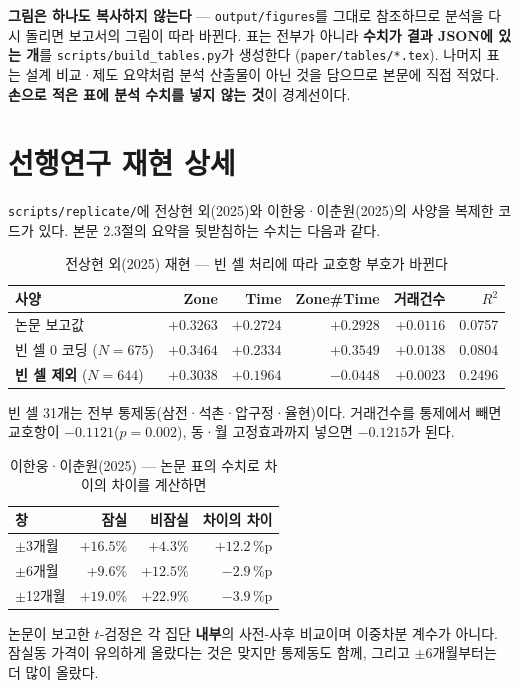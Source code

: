 \textbf{그림은 하나도 복사하지 않는다} --- \texttt{output/figures}를 그대로
참조하므로 분석을 다시 돌리면 보고서의 그림이 따라 바뀐다. 표는 전부가 아니라
\textbf{수치가 결과 JSON에 있는 \pipeTables 개}를
\texttt{scripts/build\_tables.py}가 생성한다
(\texttt{paper/tables/*.tex}). 나머지 표는 설계 비교·제도 요약처럼 분석 산출물이
아닌 것을 담으므로 본문에 직접 적었다. \textbf{손으로 적은 표에 분석 수치를
넣지 않는 것}이 경계선이다.

\section{선행연구 재현 상세}

\texttt{scripts/replicate/}에 전상현 외(2025)와 이한웅·이춘원(2025)의 사양을
복제한 코드가 있다. 본문 2.3절의 요약을 뒷받침하는 수치는 다음과 같다.

\begin{table}[htbp]
  \centering
  \caption{전상현 외(2025) 재현 --- 빈 셀 처리에 따라 교호항 부호가 바뀐다}
  \label{tab:replicate-jeon}
  \begin{tabular}{lrrrrr}
    \toprule
    \textbf{사양} & \textbf{Zone} & \textbf{Time} & \textbf{Zone\#Time} &
    \textbf{거래건수} & \textbf{$R^2$} \\
    \midrule
    논문 보고값 & $+0.3263$ & $+0.2724$ & $+0.2928$ & $+0.0116$ & 0.0757 \\
    빈 셀 0 코딩 ($N=675$) & $+0.3464$ & $+0.2334$ & $+0.3549$ & $+0.0138$ &
      0.0804 \\
    \textbf{빈 셀 제외} ($N=644$) & $+0.3038$ & $+0.1964$ &
      $\mathbf{-0.0448}$ & $+0.0023$ & 0.2496 \\
    \bottomrule
  \end{tabular}
\end{table}

빈 셀 31개는 전부 통제동(삼전·석촌·압구정·율현)이다. 거래건수를 통제에서 빼면
교호항이 $-0.1121$($p=0.002$), 동·월 고정효과까지 넣으면 $-0.1215$가 된다.

\begin{table}[htbp]
  \centering
  \caption{이한웅·이춘원(2025) --- 논문 표의 수치로 차이의 차이를 계산하면}
  \label{tab:replicate-lee}
  \begin{tabular}{lrrr}
    \toprule
    \textbf{창} & \textbf{잠실} & \textbf{비잠실} & \textbf{차이의 차이} \\
    \midrule
    $\pm$3개월 & $+16.5\%$ & $+4.3\%$ & $+12.2$\,\%p \\
    $\pm$6개월 & $+9.6\%$ & $+12.5\%$ & $\mathbf{-2.9}$\,\%p \\
    $\pm$12개월 & $+19.0\%$ & $+22.9\%$ & $\mathbf{-3.9}$\,\%p \\
    \bottomrule
  \end{tabular}
\end{table}

논문이 보고한 $t$-검정은 각 집단 \textbf{내부}의 사전-사후 비교이며 이중차분
계수가 아니다. 잠실동 가격이 유의하게 올랐다는 것은 맞지만 통제동도 함께, 그리고
$\pm$6개월부터는 더 많이 올랐다.
